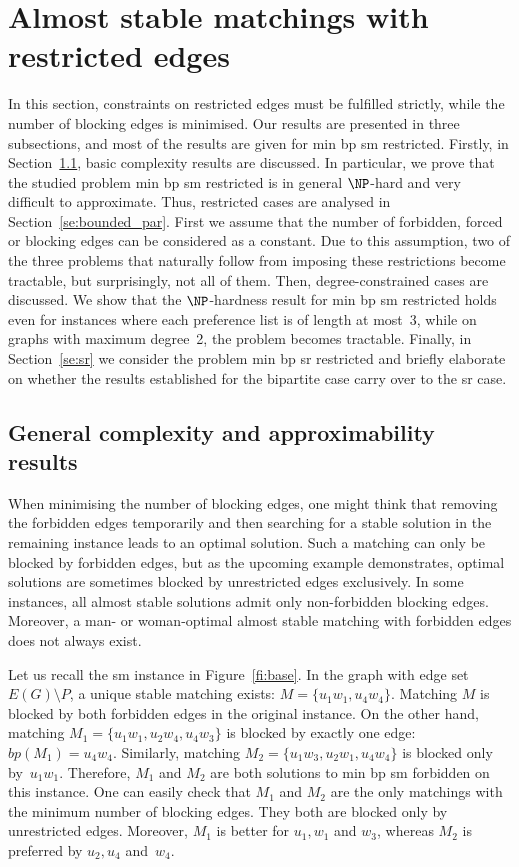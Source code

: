 \documentclass[preprint,12pt]{elsarticle}
\begin{document}
\section{Almost stable matchings with restricted edges}
\label{se:almost_stable}

In this section, constraints on restricted edges must be fulfilled strictly, while the number of blocking edges is minimised. Our results are presented in three subsections, and most of the results are given for {\sc min bp sm restricted}. Firstly, in Section~\ref{se:gencomp}, basic complexity results are discussed. In particular, we prove that the studied problem {\sc min bp sm restricted} is in general $\NP$-hard and very difficult to approximate. Thus, restricted cases are analysed in Section~\ref{se:bounded_par}. First we assume that the number of forbidden, forced or blocking edges can be considered as a constant. Due to this assumption, two of the three problems that naturally follow from imposing these restrictions become tractable, but surprisingly, not all of them. Then, degree-constrained cases are discussed. We show that the $\NP$-hardness result for {\sc min bp sm restricted} holds even for instances where each preference list is of length at most~3, while on graphs with maximum degree~2, the problem becomes tractable. Finally, in Section~\ref{se:sr} we consider the problem {\sc min bp sr restricted} and briefly elaborate on whether the results established for the bipartite case carry over to the {\sc sr} case.

\subsection{General complexity and approximability results}
\label{se:gencomp}

When minimising the number of blocking edges, one might think that removing the forbidden edges temporarily and then searching for a stable solution in the remaining instance leads to an optimal solution. Such a matching can only be blocked by forbidden edges, but as the upcoming example demonstrates, optimal solutions are sometimes blocked by unrestricted edges exclusively. In some instances, all almost stable solutions admit only non-forbidden blocking edges. Moreover, a man- or woman-optimal almost stable matching with forbidden edges does not always exist.

Let us recall the {\sc sm} instance in Figure~\ref{fi:base}. In the graph with edge set $E(G) \setminus P$, a unique stable matching exists: $M = \{u_1w_1, u_4w_4 \}$. Matching $M$ is blocked by both forbidden edges in the original instance. On the other hand, matching $M_{1} = \{u_1w_1, u_2w_4, u_4w_3\}$ is blocked by exactly one edge: $bp(M_{1}) = u_4w_4$. Similarly, matching  $M_{2} = \{u_1w_3, u_2w_1, u_4w_4\}$ is blocked only by~$u_1w_1$. Therefore, $M_1$ and $M_2$ are both solutions to {\sc min bp sm forbidden} on this instance. One can easily check that $M_{1}$ and $M_{2}$ are the only matchings with the minimum number of blocking edges. They both are blocked only by unrestricted edges. Moreover, $M_{1}$ is better for $u_1, w_1$ and $w_3$, whereas $M_{2}$ is preferred by $u_2, u_4$ and~$w_4$.
\end{document}
